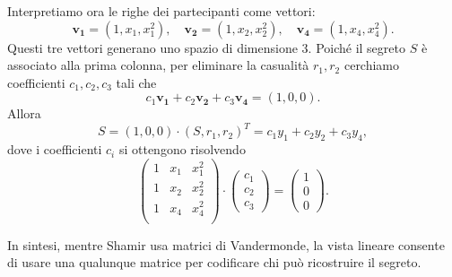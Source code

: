 \documentclass[a4paper, 11pt]{article}
\begin{document}
Interpretiamo ora le righe dei partecipanti come vettori:
\[
\mathbf{v_1}=(1,x_1,x_1^2),\quad
\mathbf{v_2}=(1,x_2,x_2^2),\quad
\mathbf{v_4}=(1,x_4,x_4^2).
\]
Questi tre vettori generano uno spazio di dimensione $3$.
Poiché il segreto $S$ è associato alla prima colonna, per eliminare la casualità $r_1,r_2$ cerchiamo coefficienti $c_1,c_2,c_3$ tali che
\[
c_1\mathbf{v_1}+c_2\mathbf{v_2}+c_3\mathbf{v_4}=(1,0,0).
\]
Allora
\[
S=(1,0,0)\cdot(S,r_1,r_2)^T=c_1y_1+c_2y_2+c_3y_4,
\]
dove i coefficienti $c_i$ si ottengono risolvendo
\[
\begin{pmatrix}
1 & x_1 & x_1^2 \\
1 & x_2 & x_2^2 \\
1 & x_4 & x_4^2 \\
\end{pmatrix}
\cdot
\begin{pmatrix}
c_1 \\ c_2 \\ c_3
\end{pmatrix}
=
\begin{pmatrix}
1 \\ 0 \\ 0
\end{pmatrix}.
\]

In sintesi, mentre Shamir usa matrici di Vandermonde, la vista lineare consente di usare una qualunque matrice per codificare chi può ricostruire il segreto.
\end{document}
